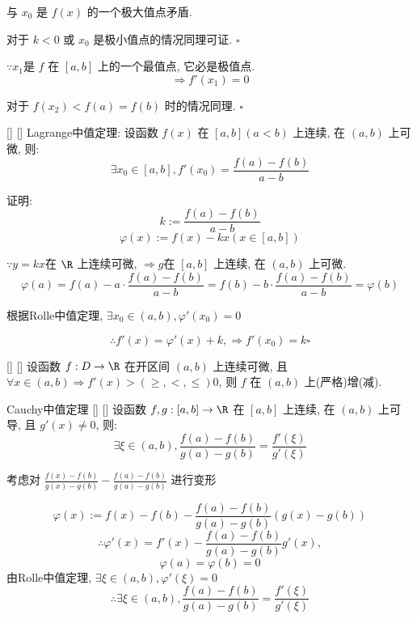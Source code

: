 \documentclass[UTF8]{ctexart}
\begin{document}
					与 \(x_0\) 是 \(f(x)\) 的一个极大值点矛盾. 
					
					对于 \(k<0\) 或 \(x_0\) 是极小值点的情况同理可证. \(\square\)
				
				\(\because x_1\)是 \(f\) 在 \([a,b]\) 上的一个最值点, 它必是极值点. 
				\[\Longrightarrow f'(x_1)=0\]
				
				对于 \(f(x_2)<f(a)=f(b)\) 时的情况同理. \(\square\)
				
			\begin{thm}
			    []
			    {}
			    []
			    []
				Lagrange中值定理: 设函数 \(f(x)\) 在 \([a,b](a<b)\) 上连续, 在 \((a,b)\) 上可微, 则: 
				\[\exists x_0\in [a,b], f'(x_0)=\frac{f(a)-f(b)}{a-b}\]
			\end{thm}
			
			证明: 
				\[k:=\frac{f(a)-f(b)}{a-b}\]
				\[\varphi(x):=f(x)-kx(x\in[a,b])\]
				
				\(\because y=kx\)在 \(\R\) 上连续可微, \(\Longrightarrow g\)在 \([a,b]\) 上连续, 在 \((a,b)\) 上可微. 
				\[\varphi(a)=f(a)-a\cdot\frac{f(a)-f(b)}{a-b}=f(b)-b\cdot\frac{f(a)-f(b)}{a-b}=\varphi(b)\]
				
				根据Rolle中值定理, \(\exists x_0\in (a,b), \varphi'(x_0)=0\)
				
				\[\therefore f'(x)=\varphi'(x)+k, \Longrightarrow f'(x_0)=k\square\]
			
			\begin{crl}
				    []
				    {}
				    []
				    []
				设函数 \(f:D\to\R\) 在开区间 \((a,b)\) 上连续可微, 且 \(\forall x\in(a,b)\Longrightarrow f'(x)>(\geq,<,\leq)0\), 则 \(f\) 在 \((a,b)\) 上(严格)增(减). 
			\end{crl}

			\begin{thm}
			    []
			    {Cauchy中值定理}
			    []
			    []
				设函数 \(f,g:[a,b]\to\R\) 在 \([a,b]\) 上连续, 在 \((a,b)\) 上可导, 且 \(g'(x)\neq 0\), 则: 
				\[\exists\xi\in(a,b), \frac{f(a)-f(b)}{g(a)-g(b)}=\frac{f'(\xi)}{g'(\xi)}\]
			\end{thm}

			\begin{prf}
				考虑对 \(\frac{f(x)-f(b)}{g(x)-g(b)}-\frac{f(a)-f(b)}{g(a)-g(b)}\) 进行变形

				\[\varphi(x):=f(x)-f(b)-\frac{f(a)-f(b)}{g(a)-g(b)}(g(x)-g(b))\]
				\[\therefore\varphi'(x)=f'(x)-\frac{f(a)-f(b)}{g(a)-g(b)}g'(x),\]
				\[\varphi(a)=\varphi(b)=0\]
				由Rolle中值定理, \(\exists\xi\in(a,b), \varphi'(\xi)=0\)
				\[\therefore\exists\xi\in(a,b), \frac{f(a)-f(b)}{g(a)-g(b)}=\frac{f'(\xi)}{g'(\xi)}\]
			\end{prf}
\end{document}
